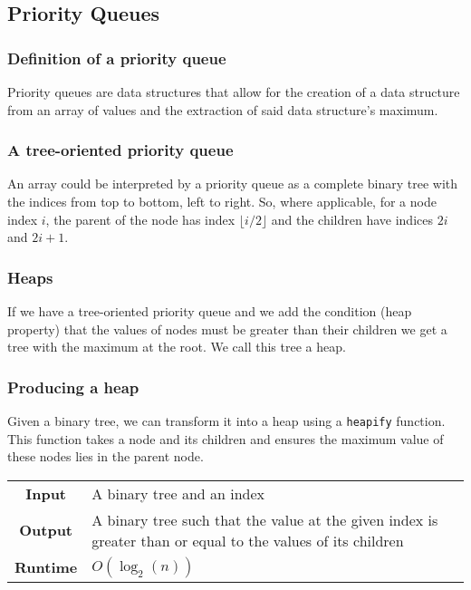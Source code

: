 \documentclass[a4paper, 12pt, twoside]{article}
\begin{document}
\newpage

\subsection{Priority Queues}

\subsubsection{Definition of a priority queue}

Priority queues are data structures that allow for the creation
of a data structure from an array of values and the extraction 
of said data structure's maximum.

\subsubsection{A tree-oriented priority queue}

An array could be interpreted by a priority queue as a complete 
binary tree with the indices from top to bottom, left to right. 
So, where applicable, for a node index $i$, the parent of the 
node has index $\lfloor i / 2 \rfloor$ and the children have 
indices $2i$ and $2i + 1$.

\subsubsection{Heaps}

If we have a tree-oriented priority queue and we add the condition
(heap property) that the values of nodes must be greater than
their children we get a tree with the maximum at the root. We
call this tree a heap.

\subsubsection{Producing a heap}

Given a binary tree, we can transform it into a heap using a
\texttt{heapify} function. This function takes a node and its children
and ensures the maximum value of these nodes lies in the parent node.

\begin{center}
      \begin{tabular}{ || c | p{8.5cm} || }
            \hline
                  \textbf{Input} & A binary tree and an index \\
                  \textbf{Output} & A binary tree such that the value 
                        at the given index is greater than or equal 
                        to the values of its children \\
            \hline\hline
                  \textbf{Runtime} & $O(\log_2(n))$ \\
            \hline
      \end{tabular}
\end{center}
\end{document}
